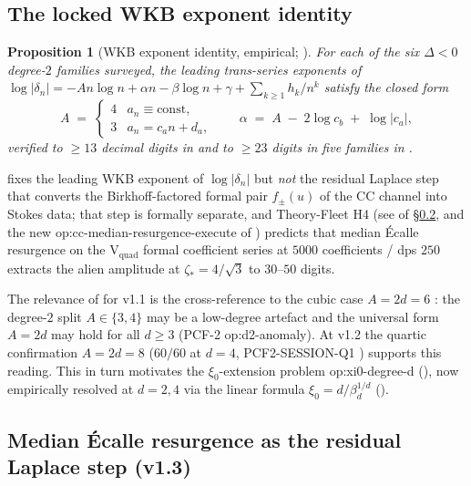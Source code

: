 \documentclass[11pt,reqno]{amsart}
\theoremstyle{plain}
\newtheorem{proposition}[theorem]{Proposition}
\theoremstyle{definition}
\theoremstyle{remark}
\newcommand{\CC}{\mathrm{CC}}
\newcommand{\dn}{\delta_{n}}
\begin{document}
\subsection{The locked WKB exponent identity}
\label{ssec:wkb}

\begin{proposition}[WKB exponent identity, empirical;
\cite{siarc_pcf1_v13,siarc_borel_kscan,siarc_cc_pipeline_f}]
\label{prop:wkb}
For each of the six $\Delta<0$ degree-$2$ families surveyed,
the leading trans-series exponents of
$\log|\dn| = -A n \log n + \alpha n - \beta \log n + \gamma
+ \sum_{k \ge 1} h_k / n^k$
satisfy the closed form
\[
  A \;=\; \begin{cases} 4 & a_n \equiv \text{const}, \\
                        3 & a_n = c_a n + d_a, \end{cases}
  \qquad
  \alpha \;=\; A \;-\; 2 \log c_b \;+\; \log|c_a|,
\]
verified to $\geq 13$ decimal digits in
\cite{siarc_borel_kscan} and to $\ge 23$ digits in
five families in \cite{siarc_cc_pipeline_f}.
\end{proposition}

 fixes the leading WKB exponent of
$\log|\dn|$ but \emph{not} the residual Laplace step that
converts the Birkhoff-factored formal pair $f_\pm(u)$ of the
$\CC$ channel into Stokes data; that step is formally
separate, and Theory-Fleet H4 (see 
of \S\ref{ssec:h4-median}, and the new
\textsf{op:cc-median-resurgence-execute} of
) predicts that median \'Ecalle resurgence
on the V$_{\mathrm{quad}}$ formal coefficient series at
$5000$ coefficients / dps $250$ extracts the alien
amplitude at $\zeta_*=4/\sqrt 3$ to $30$--$50$ digits.

The relevance of  for v1.1 is the
cross-reference to the cubic case
$A = 2d = 6$ \cite{siarc_pcf2_v11}: the degree-$2$ split
$A \in \{3, 4\}$ may be a low-degree artefact and the
universal form $A = 2d$ may hold for all $d \ge 3$ (PCF-2
\textsf{op:d2-anomaly}). At v1.2 the quartic confirmation
$A = 2d = 8$ ($60/60$ at $d=4$, PCF2-SESSION-Q1
\cite{siarc_pcf2_session_q1}) supports this reading. This in
turn motivates the $\xi_0$-extension problem
\textsf{op:xi0-degree-d} (), now empirically
resolved at $d=2,4$ via the linear formula
$\xi_0 = d / \beta_d^{1/d}$ ().

\subsection{Median \'Ecalle resurgence as the residual
Laplace step (v1.3)}
\label{ssec:h4-median}
\end{document}
